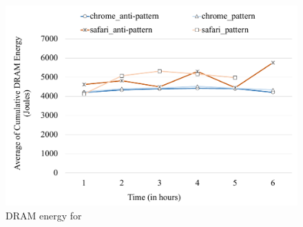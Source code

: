  \begin{figure}[ht]
 	\includegraphics[width=\linewidth]{RQ3/Img/rq3-lazyload-cumulative-DRAM-eng-joul.pdf}
	\caption{DRAM energy for \oown}
	\label{fig:rq3-lazyload-package-DRAM-eng}	
\end{figure}